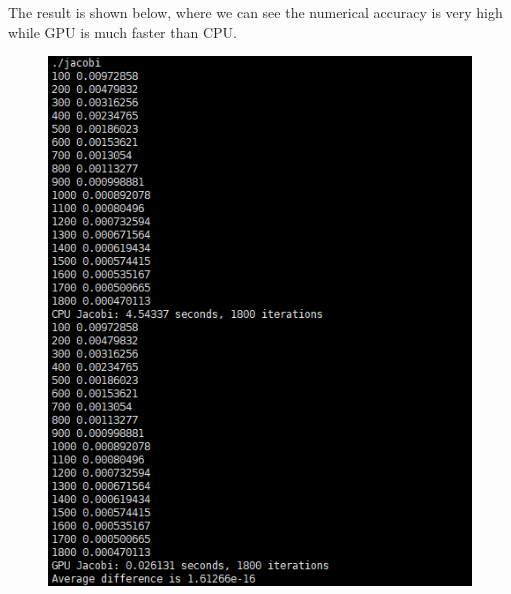 \documentclass[english]{thesis}
\begin{document}
The result is shown below, where we can see the numerical accuracy is very high while GPU is much faster than CPU.

\begin{figure}[H]
\centering
\includegraphics[width=0.8\linewidth]{fig/res2.PNG}
\end{figure}
\end{document}
